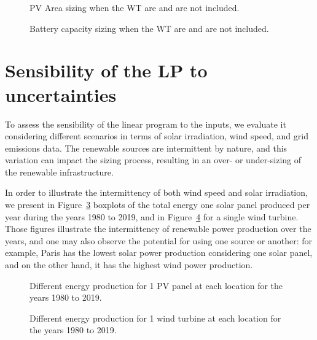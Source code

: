 \begin{figure}[H]
  \centering
  {}
  \caption{PV Area sizing when the WT are and are not included. }
  \label{fig:wind_pv}
\end{figure}


\begin{figure}[H]
  \centering
  {}
  \caption{Battery capacity sizing when the WT are and are not included. }
  \label{fig:wind_bat}

\end{figure}


\section{Sensibility of the LP to  uncertainties}
\label{sec:sensitivity}

To assess the sensibility of the linear program to the inputs, we evaluate it considering different scenarios in terms of solar irradiation, wind speed, and grid emissions data. The renewable sources are intermittent by nature, and this variation can impact the sizing process, resulting in an over- or under-sizing of the renewable infrastructure.


In order to illustrate the intermittency of both wind speed and solar irradiation, we present in Figure~\ref{fig:pv_boxplots} boxplots of the total energy one solar panel produced per year during the years 1980 to 2019, and in Figure~\ref{fig:wt_boxplots} for a single wind turbine. Those figures illustrate the intermittency of renewable power production over the years, and one may also observe the potential for using one source or another: for example, Paris has the lowest solar power production considering one solar panel, and on the other hand, it has the highest wind power production. 

\begin{figure}[H]
  \centering
  {}
  \caption{Different energy production for 1 PV panel at each location for the years 1980 to 2019.}
  \label{fig:pv_boxplots}
\end{figure}


\begin{figure}[H]
  \centering
  {}
  \caption{Different energy production for 1 wind turbine at each location for the years 1980 to 2019.}
  \label{fig:wt_boxplots}
\end{figure}



